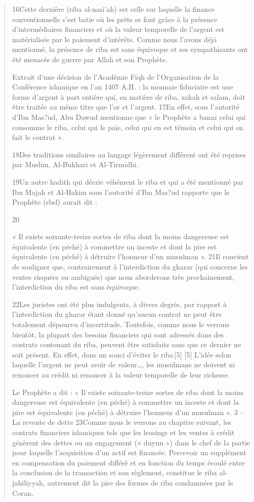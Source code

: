 \begin{quote}
    
 
16Cette dernière (riba al-nasi’ah) est celle sur laquelle la finance conventionnelle s’est batie où les prêts se font grâce à la présence d’intermédiaires financiers et où la valeur temporelle de l’argent est matérialisée par le paiement d’intérêts. Comme nous l’avons déjà mentionné, la présence de riba est sans équivoque et ses sympathisants ont été menacés de guerre par Allah et son Prophète.

Extrait d’une décision de l’Académie Fiqh de l’Organisation de la Conférence islamique en l’an 1407 A.H. : la monnaie fiduciaire est une forme d’argent à part entière qui, en matière de riba, zakah et salam, doit être traitée au même titre que l’or et l’argent.
17En effet, sous l’autorité d’Ibn Mas?ud, Abu Dawud mentionne que « le Prophète a banni celui qui consomme le riba, celui qui le paie, celui qui en est témoin et celui qui en fait le contrat ».

18Des traditions similaires au langage légèrement différent ont été reprises par Muslim, Al-Bukhari et Al-Tirmidhi.

19Un autre hadith qui décrie véhément le riba et qui a été mentionné par Ibn Majah et Al-Hakim sous l’autorité d’Ibn Mas?ud rapporte que le Prophète (sbsl) aurait dit :

20

« Il existe soixante-treize sortes de riba dont la moins dangereuse est équivalente (en péché) à commettre un inceste et dont la pire est équivalente (en péché) à détruire l’honneur d’un musulman ».
21Il convient de souligner que, contrairement à l’interdiction du gharar (qui concerne les ventes risquées ou ambiguës) que nous aborderons très prochainement, l’interdiction du riba est sans équivoque.

22Les juristes ont été plus indulgents, à divers degrés, par rapport à l’interdiction du gharar étant donné qu’aucun contrat ne peut être totalement dépourvu d’incertitude. Toutefois, comme nous le verrons bientôt, la plupart des besoins financiers qui sont adressés dans des contrats contenant du riba, peuvent être satisfaits sans que ce dernier ne soit présent. En effet, dans un souci d’éviter le riba [5]
[5]
L’idée selon laquelle l’argent ne peut avoir de valeur…, les musulmans ne doivent ni renoncer au crédit ni renoncer à la valeur temporelle de leur richesse.

Le Prophète a dit : « Il existe soixante-treize sortes de riba dont la moins dangereuse est équivalente (en péché) à commettre un inceste et dont la pire est équivalente (en péché) à détruire l’honneur d’un musulman ».
3 – La revente de dette
23Comme nous le verrons au chapitre suivant, les contrats financiers islamiques tels que les leasings et les ventes à crédit génèrent des dettes ou un engagement (« duyun ») dans le chef de la partie pour laquelle l’acquisition d’un actif est financée. Percevoir un supplément en compensation du paiement différé et en fonction du temps écoulé entre la conclusion de la transaction et son règlement, constitue le riba al-jahiliyyah, autrement dit la pire des formes de riba condamnées par le Coran.


\end{quote}

